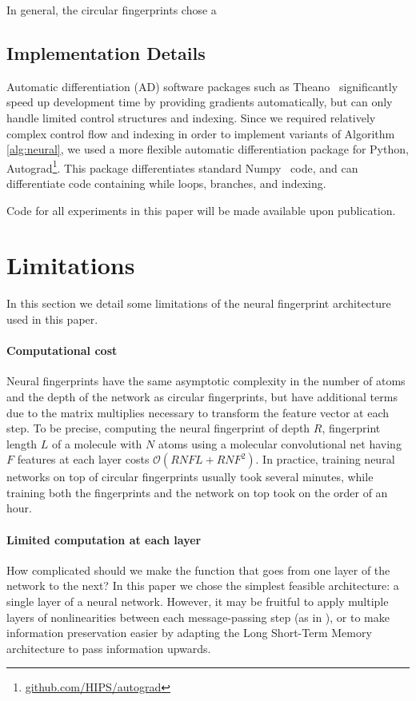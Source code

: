 \documentclass{article}
\begin{document}
In general, the circular fingerprints chose a 


\subsection{Implementation Details}
Automatic differentiation (AD) software packages such as
Theano~\citep{Bastien-Theano-2012, bergstra2010scipy} significantly speed up development time by providing gradients automatically, but can only handle limited control structures and indexing.
Since we required relatively complex control flow and indexing in order to implement variants of Algorithm \ref{alg:neural}, we used a more flexible automatic differentiation package for Python, Autograd\footnote{\url{github.com/HIPS/autograd}}.
This package differentiates standard Numpy~\citep{oliphant2007python} code, and can differentiate code containing while loops, branches, and indexing.

Code for all experiments in this paper will be made available upon publication.

\section{Limitations}

In this section we detail some limitations of the neural fingerprint architecture used in this paper.

\paragraph{Computational cost}
Neural fingerprints have the same asymptotic complexity in the number of atoms and the depth of the network as circular fingerprints, but have additional terms due to the matrix multiplies necessary to transform the feature vector at each step.
To be precise, computing the neural fingerprint of depth $R$, fingerprint length $L$ of a molecule with $N$ atoms using a molecular convolutional net having $F$ features at each layer costs $\mathcal{O}(RNFL + RNF^2)$.
In practice, training neural networks on top of circular fingerprints usually took several minutes, while training both the fingerprints and the network on top took on the order of an hour.

\paragraph{Limited computation at each layer}
How complicated should we make the function that goes from one layer of the network to the next?
In this paper we chose the simplest feasible architecture: a single layer of a neural network.
However, it may be fruitful to apply multiple layers of nonlinearities between each message-passing step (as in \cite{graphnn2009}), or to make information preservation easier by adapting the Long Short-Term Memory~\citep{hochreiter1997long} architecture to pass information upwards.
\end{document}
